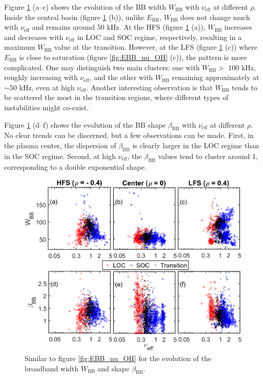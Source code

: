 Figure \ref{fig:WBB_nu_OH} (a--c) shows the evolution of the BB width $W_\mathrm{BB}$ with $\nu_\mathrm{eff}$ at different $\rho$. Inside the central basin (figure \ref{fig:WBB_nu_OH} (b)), unlike $E_\mathrm{BB}$, $W_\mathrm{BB}$ does not change much with $\nu_\mathrm{eff}$ and remains around 50 kHz. At the HFS (figure \ref{fig:WBB_nu_OH} (a)), $W_\mathrm{BB}$ increases and decreases with $\nu_\mathrm{eff}$ in LOC and SOC regime, respectively, resulting in a maximum $W_\mathrm{BB}$ value at the transition. However, at the LFS (figure \ref{fig:WBB_nu_OH} (c)) where $E_\mathrm{BB}$ is close to saturation (figure \ref{fig:EBB_nu_OH} (c)), the pattern is more complicated. One may distinguish two main clusters: one with $W_\mathrm{BB}>$ 100 kHz, roughly increasing with $\nu_\mathrm{eff}$, and the other with $W_\mathrm{BB}$ remaining approximately at $\sim 50$ kHz, even at high $\nu_\mathrm{eff}$. Another interesting observation is that $W_\mathrm{BB}$ tends to be scattered the most in the transition regions, where different types of instabilities might co-exist.

Figure \ref{fig:WBB_nu_OH} (d--f) shows the evolution of the BB shape $\beta_\mathrm{BB}$ with $\nu_\mathrm{eff}$ at different $\rho$. No clear trends can be discerned, but a few observations can be made. First, in the plasma center, the dispersion of $\beta_\mathrm{BB}$ is clearly larger in the LOC regime than in the SOC regime. Second, at high $\nu_\mathrm{eff}$, the $\beta_\mathrm{BB}$ values tend to cluster around 1, corresponding to a double exponential shape.
\begin{figure}[h]
\begin{centering}
\includegraphics[scale=0.75]{fig_WBB_betaBB_nu_OH.eps}
\par\end{centering}
\caption{Similar to figure \ref{fig:EBB_nu_OH} for the evolution of the broadband width $W_\mathrm{BB}$ and shape $\beta_\mathrm{BB}$.}
\label{fig:WBB_nu_OH}
\end{figure}


